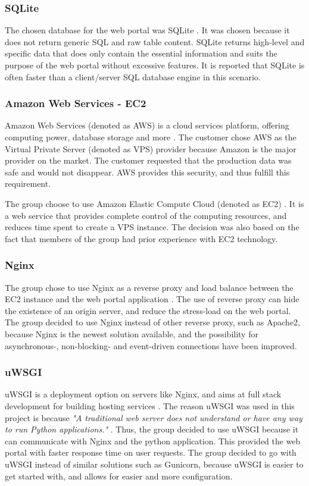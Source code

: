 \subsubsection{SQLite}
The chosen database for the web portal was SQLite \cite{SQLite}. It was chosen because it does not return generic SQL and raw table content. SQLite returns high-level and specific data that does only contain the essential information and suits the purpose of the web portal without excessive features. It is reported that SQLite is often faster than a client/server SQL database engine in this scenario. \cite{Server-sideDatabase} 

\subsubsection{Amazon Web Services - EC2}
Amazon Web Services (denoted as AWS) is a cloud services platform, offering computing power, database storage and more \cite{AWS}. The customer chose AWS as the Virtual Private Server (denoted as VPS) provider because Amazon is the major provider on the market. The customer requested that the production data was safe and would not disappear. AWS provides this security, and thus fulfill this requirement.

The group choose to use Amazon Elastic Compute Cloud (denoted as EC2) \cite{EC2}. It is a web service that provides complete control of the computing resources, and reduces time spent to create a VPS instance. The decision was also based on the fact that members of the group had prior experience with EC2 technology. 

\subsubsection{Nginx}
The group chose to use Nginx as a reverse proxy and load balance between the EC2 instance and the web portal application \cite{nginx}. The use of reverse proxy can hide the existence of an origin server, and reduce the stress-load on the web portal. The group decided to use Nginx instead of other reverse proxy, such as Apache2, because Nginx is the newest solution available, and the possibility for asynchronous-, non-blocking- and event-driven connections have been improved.

\subsubsection{uWSGI}
uWSGI is a deployment option on servers like Nginx, and aims at full stack development for building hosting services \cite{uWSGI}. The reason uWSGI was used in this project is because \textit{"A traditional web server does not understand or have any way to run Python applications."} \cite{whyUseWSGI}. Thus, the group decided to use uWSGI because it can communicate with Nginx and the python application. This provided the web portal with faster response time on user requests. The group decided to go with uWSGI instead of similar solutions such as Gunicorn, because uWSGI is easier to get started with, and allows for easier and more configuration.

\cleardoublepage